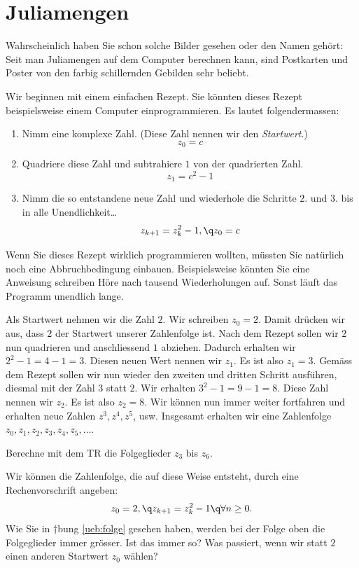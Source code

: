 \documentclass[%
11pt,%
twoside,%
titlepage,%
german,%
headsepline%
]{scrartcl}
\begin{document}
\section{Juliamengen}

Wahrscheinlich haben Sie schon solche Bilder gesehen oder den Namen geh\"ort: Seit man Juliamengen auf dem Computer berechnen kann, sind Postkarten und Poster von den farbig schillernden Gebilden sehr beliebt.

Wir beginnen mit einem einfachen Rezept. Sie k\"onnten dieses Rezept beispielsweise einem Computer einprogrammieren. Es lautet folgendermassen:
\begin{enumerate}
\item Nimm eine komplexe Zahl. (Diese Zahl nennen wir den \emph{Startwert}.)
$$z_0=c$$
\item Quadriere diese Zahl und subtrahiere $1$ von der quadrierten Zahl.
$$z_1=c^2-1$$
\item Nimm die so entstandene neue Zahl und wiederhole die Schritte $2.$ und $3.$ bis in alle Unendlichkeit\dots
$$z_{k+1}=z_k^2-1,\q z_0=c$$
\end{enumerate}
\begin{bem}
Wenn Sie dieses Rezept wirklich programmieren wollten, m\"ussten Sie nat\"urlich noch eine Abbruchbedingung einbauen. Beispielsweise k\"onnten Sie eine Anweisung schreiben \glqq H\"ore nach tausend Wiederholungen auf\grqq. Sonst läuft das Programm unendlich lange.
\end{bem}

\begin{bsp}
Als Startwert nehmen wir die Zahl $2$. Wir schreiben $z_0 = 2$. Damit dr\"ucken wir aus, dass $2$ der Startwert unserer Zahlenfolge ist.
Nach dem Rezept sollen wir $2$ nun quadrieren und anschliessend $1$ abziehen. Dadurch erhalten wir $2^2 - 1 = 4 - 1 = 3$. Diesen neuen Wert nennen wir $z_1$. Es ist also $z_1 = 3$.
Gemäss dem Rezept sollen wir nun wieder den zweiten und dritten Schritt ausf\"uhren, diesmal mit der Zahl $3$ statt $2$. Wir erhalten $3^2 -1 = 9-1 = 8$. Diese Zahl nennen wir $z_2$. Es ist also $z_2 = 8$.
Wir k\"onnen nun immer weiter fortfahren und erhalten neue Zahlen $z^3, z^4, z^5$, usw. Insgesamt erhalten wir eine Zahlenfolge $z_0, z_1, z_2, z_3, z_4, z_5,\dots$.
\end{bsp}
\begin{ueb}[Folge] \label{ueb:folge}
Berechne mit dem TR die Folgeglieder $z_3$ bis $z_6$.
\end{ueb}
Wir k\"onnen die Zahlenfolge, die auf diese Weise entsteht, durch eine Rechenvorschrift angeben:
$$z_0=2,\q z_{k+1}=z_k^2-1\q\forall n\geq0.$$
Wie Sie in †bung \ref{ueb:folge} gesehen haben, werden bei der Folge oben die Folgeglieder immer gr\"osser. Ist das immer so? Was passiert, wenn wir statt $2$ einen anderen Startwert $z_0$ wählen?
\end{document}
